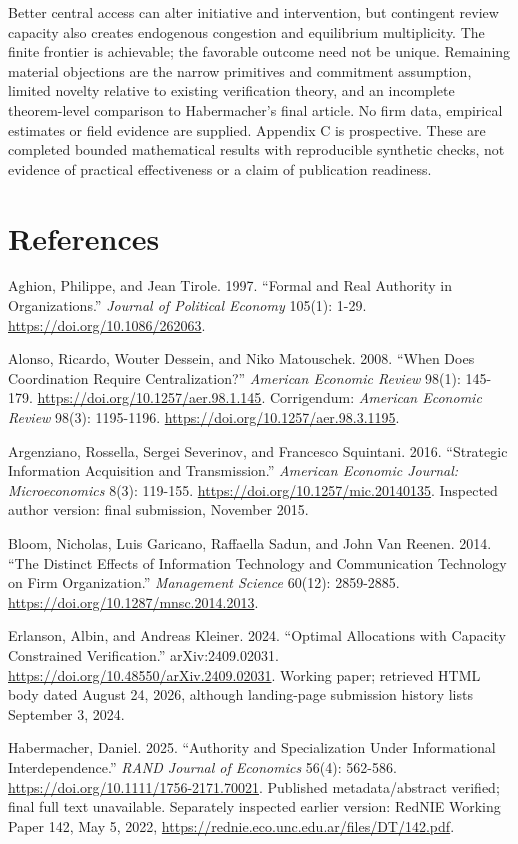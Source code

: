 \documentclass[
  11pt,
]{article}
\begin{document}
Better central access can alter initiative and intervention, but
contingent review capacity also creates endogenous congestion and
equilibrium multiplicity. The finite frontier is achievable; the
favorable outcome need not be unique. Remaining material objections are
the narrow primitives and commitment assumption, limited novelty
relative to existing verification theory, and an incomplete
theorem-level comparison to Habermacher's final article. No firm data,
empirical estimates or field evidence are supplied. Appendix C is
prospective. These are completed bounded mathematical results with
reproducible synthetic checks, not evidence of practical effectiveness
or a claim of publication readiness.


{
\small
\setlength{\parindent}{0pt}
\section*{References}\label{references}

Aghion, Philippe, and Jean Tirole. 1997. ``Formal and Real Authority in
Organizations.'' \emph{Journal of Political Economy} 105(1): 1-29.
\url{https://doi.org/10.1086/262063}.

Alonso, Ricardo, Wouter Dessein, and Niko Matouschek. 2008. ``When Does
Coordination Require Centralization?'' \emph{American Economic Review}
98(1): 145-179. \url{https://doi.org/10.1257/aer.98.1.145}. Corrigendum:
\emph{American Economic Review} 98(3): 1195-1196.
\url{https://doi.org/10.1257/aer.98.3.1195}.

Argenziano, Rossella, Sergei Severinov, and Francesco Squintani. 2016.
``Strategic Information Acquisition and Transmission.'' \emph{American
Economic Journal: Microeconomics} 8(3): 119-155.
\url{https://doi.org/10.1257/mic.20140135}. Inspected author version: final
submission, November 2015.

Bloom, Nicholas, Luis Garicano, Raffaella Sadun, and John Van Reenen.
2014. ``The Distinct Effects of Information Technology and Communication
Technology on Firm Organization.'' \emph{Management Science} 60(12):
2859-2885. \url{https://doi.org/10.1287/mnsc.2014.2013}.

Erlanson, Albin, and Andreas Kleiner. 2024. ``Optimal Allocations with
Capacity Constrained Verification.'' arXiv:2409.02031.
\url{https://doi.org/10.48550/arXiv.2409.02031}. Working paper; retrieved HTML
body dated August 24, 2026, although landing-page submission history
lists September 3, 2024.

Habermacher, Daniel. 2025. ``Authority and Specialization Under
Informational Interdependence.'' \emph{RAND Journal of Economics} 56(4):
562-586. \url{https://doi.org/10.1111/1756-2171.70021}. Published
metadata/abstract verified; final full text unavailable. Separately
inspected earlier version: RedNIE Working Paper 142, May 5, 2022,
\url{https://rednie.eco.unc.edu.ar/files/DT/142.pdf}.

}
\end{document}
